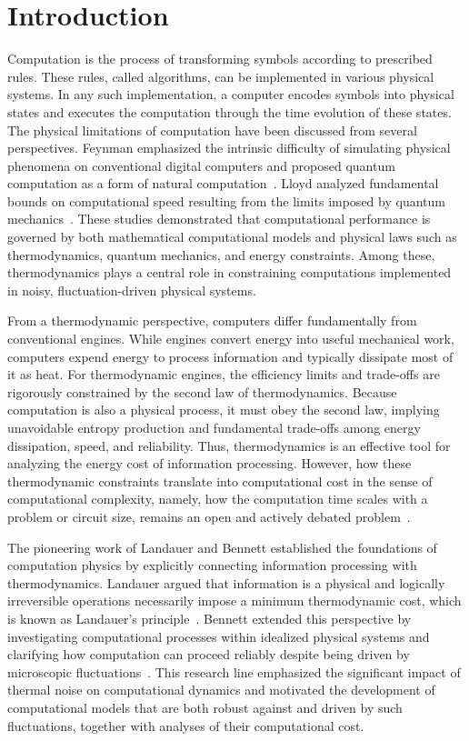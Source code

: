 \documentclass[%
 reprint,
superscriptaddress,
 amsmath,amssymb,
 aps,
 prx,
]{revtex4-2}
\begin{document}

\section{Introduction}
Computation is the process of transforming symbols according to prescribed rules. These rules, called algorithms, can be implemented in various physical systems. In any such implementation, a computer encodes symbols into physical states and executes the computation through the time evolution of these states.
The physical limitations of computation have been discussed from several perspectives. Feynman emphasized the intrinsic difficulty of simulating physical phenomena on conventional digital computers and proposed quantum computation as a form of natural computation~\cite{feynman_simulating_1982}. Lloyd analyzed fundamental bounds on computational speed resulting from the limits imposed by quantum mechanics~\cite {lloyd_ultimate_2000}. These studies demonstrated that computational performance is governed by both mathematical computational models and physical laws such as thermodynamics, quantum mechanics, and energy constraints. Among these, thermodynamics plays a central role in constraining computations implemented in noisy, fluctuation-driven physical systems. 

From a thermodynamic perspective, computers differ fundamentally from conventional engines. While engines convert energy into useful mechanical work, computers expend energy to process information and typically dissipate most of it as heat. For thermodynamic engines, the efficiency limits and trade-offs are rigorously constrained by the second law of thermodynamics. Because computation is also a physical process, it must obey the second law, implying unavoidable entropy production and fundamental trade-offs among energy dissipation, speed, and reliability. Thus, thermodynamics is an effective tool for analyzing the energy cost of information processing. However, how these thermodynamic constraints translate into computational cost in the sense of computational complexity, namely, how the computation time scales with a problem or circuit size, remains an open and actively debated problem~\cite{wolpert_is_2024}. 

The pioneering work of Landauer and Bennett established the foundations of computation physics by explicitly connecting information processing with thermodynamics. Landauer argued that information is a physical and logically irreversible operations necessarily impose a minimum thermodynamic cost, which is known as Landauer's principle~\cite{landauer_information_1991,landauer_irreversibility_1961}. Bennett extended this perspective by investigating computational processes within idealized physical systems and clarifying how computation can proceed reliably despite being driven by microscopic fluctuations~\cite{bennett_thermodynamics_1982}. This research line emphasized the significant impact of thermal noise on computational dynamics and motivated the development of computational models that are both robust against and driven by such fluctuations, together with analyses of their computational cost.
\end{document}
